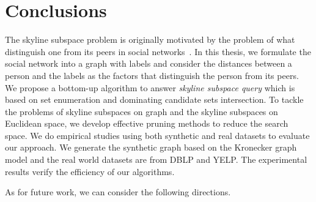 
%
%

\chapter{Conclusions}
\label{ch:con}

The skyline subspace problem is originally motivated by the problem of what distinguish one from its peers in social networks~\cite{lo2013distinguish}. In this thesis, we formulate the social network into a graph with labels and consider the distances between a person and the labels as the factors that distinguish the person from its peers. We propose a bottom-up algorithm to answer \emph{skyline subspace query} which is based on set enumeration and dominating candidate sets intersection. To tackle the problems of skyline subspaces on graph and the skyline subspaces on Euclidean space, we develop effective pruning methods to reduce the search space. 
We do empirical studies using both synthetic and real datasets to evaluate our approach. We generate the synthetic graph based on the Kronecker graph model and the real world datasets are from DBLP and YELP. The experimental results verify the efficiency of our algorithms.

As for future work, we can consider the following directions.  

